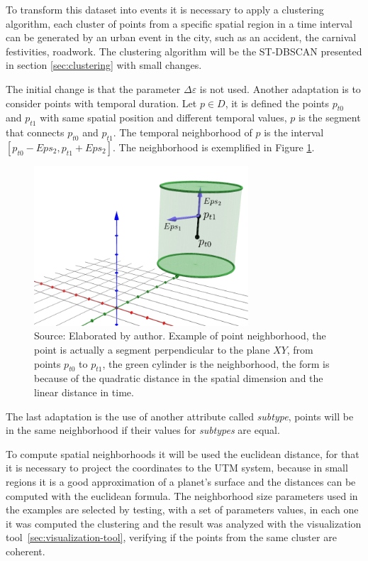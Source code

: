 To transform this dataset into events it is necessary to apply a clustering algorithm,
%
each cluster of points from a specific spatial region in a time interval can be generated by an urban event in the city, 
%
such as an accident, the carnival festivities, roadwork.
%
The clustering algorithm will be the ST-DBSCAN presented in section \ref{sec:clustering} with small changes.

%
The initial change is that the parameter $\Delta \varepsilon$ is not used. 
%  
Another adaptation is to consider points with temporal duration. Let $p \in D$, it is defined the points $p_{t0}$ and $p_{t1}$ with same spatial position and different temporal values, $p$ is the segment that connects $p_{t0}$ and $p_{t1}$. The temporal neighborhood of $p$ is the interval $[p_{t0} - Eps_2, p_{t1} + Eps_2]$. The neighborhood is exemplified in Figure \ref{fig:stdbscan_neighborhood}.

\begin{figure}
    \centering
    \includegraphics[width = 8cm]{src/imgs/point_neighborhood_stdbscan.pdf}
    \caption{Source: Elaborated by author. Example of point neighborhood, the point is actually a segment perpendicular to the plane $XY$, from points $p_{t0}$ to $p_{t1}$, the green cylinder is the neighborhood, the form is because of the quadratic distance in the spatial dimension and the linear distance in time.} 
    \label{fig:stdbscan_neighborhood}
\end{figure}

 
%
The last adaptation is the use of another attribute called \textit{subtype}, points will be in the same neighborhood if their values for \textit{subtypes} are equal. 

%
To compute spatial neighborhoods it will be used the euclidean distance, for that it is necessary to project the coordinates to the UTM system,
%
because in small regions it is a good approximation of a planet's surface and the distances can be computed with the euclidean formula.
%
The neighborhood size parameters used in the examples are selected by testing, with a set of parameters values, in each one it was computed the clustering and the result was analyzed with the visualization tool~\ref{sec:visualization-tool}, verifying if the points from the same cluster are coherent.


